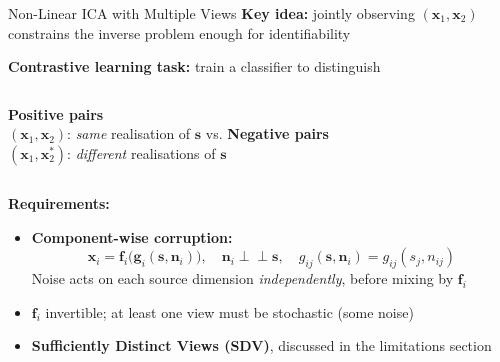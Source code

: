 \documentclass[aspectratio=169, 10pt]{beamer}
\begin{document}
\begin{frame}{Non-Linear ICA with Multiple Views}
  \textbf{Key idea:} jointly observing $(\mathbf{x}_1,\mathbf{x}_2)$ constrains the inverse problem enough for
  identifiability

  \bigskip
  \begin{center}
    \textbf{Contrastive learning task:} train a classifier to distinguish
  \end{center}
  \begin{columns}
    \centering
      \textcolor{green!55!black}{\textbf{Positive pairs}}\\
      $(\mathbf{x}_1,\mathbf{x}_2)$: \emph{same} realisation of $\mathbf{s}$
    \centering vs.
    \centering
      \textcolor{red!70!black}{\textbf{Negative pairs}}\\
      $(\mathbf{x}_1,\mathbf{x}_2^*)$: \emph{different} realisations of $\mathbf{s}$
  \end{columns}

  \bigskip
  \textbf{Requirements:}
  \begin{itemize}
    \item \textbf{Component-wise corruption:}
      \[
        \mathbf{x}_i = \mathbf{f}_i\!\bigl(\mathbf{g}_i(\mathbf{s},\mathbf{n}_i)\bigr),
        \quad
        \mathbf{n}_i \perp\!\!\!\perp \mathbf{s},
        \quad
        g_{ij}(\mathbf{s},\mathbf{n}_i) = g_{ij}(s_j, n_{ij})
      \]
      Noise acts on each source dimension \emph{independently}, before mixing by $\mathbf{f}_i$
    \item $\mathbf{f}_i$ invertible; at least one view must be stochastic (some noise)
    \item \textbf{Sufficiently Distinct Views (SDV)}, discussed in the limitations section
  \end{itemize}
\end{frame}
\end{document}
